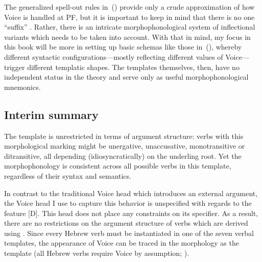 \begin{exe}
\begin{xlist}
\begin{exe}
\begin{xlist}
\begin{exe}
\begin{xlist}
\begin{exe}
\begin{exe}
\begin{xlist}
\begin{exe}
\begin{xlist}
\begin{exe}
\begin{xlist}
\begin{exe}
\begin{xlist}
\begin{exe}
\begin{xlist}
\begin{exe}
\begin{xlist}
\begin{exe}
\begin{xlist}
\begin{exe}
\begin{xlist}
\begin{exe}
\begin{xlist}
\begin{exe}
\begin{xlist}
\begin{exe}
\begin{xlist}
\begin{exe}
\begin{xlist}
\begin{exe}
\begin{exe}
\begin{xlist}
\begin{exe}
\begin{xlist}
\begin{exe}
\begin{xlist}
\begin{exe}
\begin{xlist}
{\begin{exe}
\begin{xlist}
\begin{exe}
\begin{xlist}
\begin{exe}
\begin{xlist}
\begin{exe}
\begin{xlist}
\begin{xlist}
\begin{xlist}
\begin{exe}
\begin{xlist}
\begin{xlist}
\begin{xlist}
\begin{exe}
\begin{exe}
\begin{xlist}
The generalized spell-out rules in~(\lastx) provide only a crude approximation of how Voice is handled at PF, but it is important to keep in mind that there is no one ``suffix'' {\tkal}. Rather, there is an intricate morphophonological system of inflectional variants which needs to be taken into account. With that in mind, my focus in this book will be more in setting up basic schemas like those in~(\lastx), whereby different syntactic configurations---mostly reflecting different values of Voice---trigger different templatic shapes. The templates themselves, then, have no independent status in the theory and serve only as useful morphophonological mnemonics.

	\subsection{Interim summary} \label{voice:voice:sum}
The template {\tkal} is unrestricted in terms of argument structure: verbs with this morphological marking might be unergative, unaccusative, monotransitive or ditransitive, all depending (idiosyncratically) on the underling root. Yet the morphophonology is consistent across all possible verbs in this template, regardless of their syntax and semantics.

In contrast to the traditional Voice head which introduces an external argument, the Voice head I use to capture this behavior is unspecified with regards to the  feature [D]. This head does not place any constraints on its specifier. As a result, there are no restrictions on the argument structure of verbs which are derived using . Since every Hebrew verb must be instantiated in one of the seven verbal templates, the appearance of Voice can be traced in the morphology as the template {\tkal} (all Hebrew verbs require Voice by assumption; \citealt{arad05}).


\end{xlist}
\end{exe}
\end{exe}
\end{xlist}
\end{xlist}
\end{xlist}
\end{exe}
\end{xlist}
\end{xlist}
\end{xlist}
\end{exe}
\end{xlist}
\end{exe}
\end{xlist}
\end{exe}
\end{xlist}
\end{exe}}
\end{xlist}
\end{exe}
\end{xlist}
\end{exe}
\end{xlist}
\end{exe}
\end{xlist}
\end{exe}
\end{exe}
\end{xlist}
\end{exe}
\end{xlist}
\end{exe}
\end{xlist}
\end{exe}
\end{xlist}
\end{exe}
\end{xlist}
\end{exe}
\end{xlist}
\end{exe}
\end{xlist}
\end{exe}
\end{xlist}
\end{exe}
\end{xlist}
\end{exe}
\end{xlist}
\end{exe}
\end{xlist}
\end{exe}
\end{xlist}
\end{exe}
\end{exe}
\end{xlist}
\end{exe}
\end{xlist}
\end{exe}
\end{xlist}
\end{exe}

